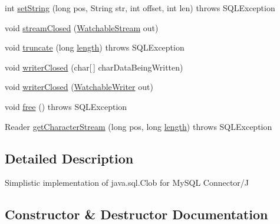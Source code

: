 \begin{DoxyCompactItemize}
\item 
int \mbox{\hyperlink{classcom_1_1mysql_1_1cj_1_1jdbc_1_1_clob_ad219cc0c1ae1ab62a8819a31382d6276}{set\+String}} (long pos, String str, int offset, int len)  throws S\+Q\+L\+Exception 
\item 
void \mbox{\hyperlink{classcom_1_1mysql_1_1cj_1_1jdbc_1_1_clob_afce3b43001378654ee8a1d99c8685eeb}{stream\+Closed}} (\mbox{\hyperlink{interfacecom_1_1mysql_1_1cj_1_1protocol_1_1_watchable_stream}{Watchable\+Stream}} out)
\item 
void \mbox{\hyperlink{classcom_1_1mysql_1_1cj_1_1jdbc_1_1_clob_a2038effd43fab99bf2553026fe76131c}{truncate}} (long \mbox{\hyperlink{classcom_1_1mysql_1_1cj_1_1jdbc_1_1_clob_a34d1c1c51a7cab4cb589c6743f78f3d1}{length}})  throws S\+Q\+L\+Exception 
\item 
void \mbox{\hyperlink{classcom_1_1mysql_1_1cj_1_1jdbc_1_1_clob_a511b2df17d5336e806c022512c86e042}{writer\+Closed}} (char\mbox{[}$\,$\mbox{]} char\+Data\+Being\+Written)
\item 
void \mbox{\hyperlink{classcom_1_1mysql_1_1cj_1_1jdbc_1_1_clob_ab6d96b9b821f777e7b25850ceb480c2b}{writer\+Closed}} (\mbox{\hyperlink{classcom_1_1mysql_1_1cj_1_1protocol_1_1_watchable_writer}{Watchable\+Writer}} out)
\item 
void \mbox{\hyperlink{classcom_1_1mysql_1_1cj_1_1jdbc_1_1_clob_ab87f9b3eae069b4b8d7d78f3532c17ec}{free}} ()  throws S\+Q\+L\+Exception 
\item 
Reader \mbox{\hyperlink{classcom_1_1mysql_1_1cj_1_1jdbc_1_1_clob_a4ac4032fb87f049f6a0368706804cb18}{get\+Character\+Stream}} (long pos, long \mbox{\hyperlink{classcom_1_1mysql_1_1cj_1_1jdbc_1_1_clob_a34d1c1c51a7cab4cb589c6743f78f3d1}{length}})  throws S\+Q\+L\+Exception 
\end{DoxyCompactItemize}


\subsection{Detailed Description}
Simplistic implementation of java.\+sql.\+Clob for My\+S\+QL Connector/J 

\subsection{Constructor \& Destructor Documentation}
\mbox{\label{classcom_1_1mysql_1_1cj_1_1jdbc_1_1_clob_a782b5a3df742e495e2b59d7b9b5abdc4}} 
